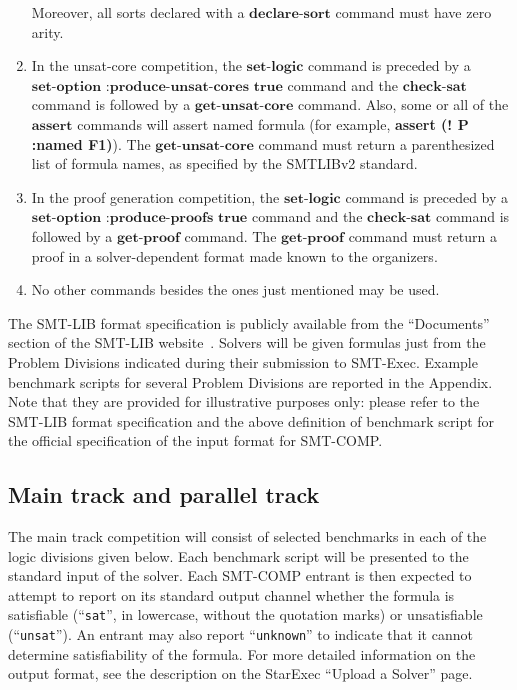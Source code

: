 \documentclass[12pt]{article}
\newcommand{\akey}[1]{\textbf{#1}}
\begin{document}
\begin{enumerate}
  Moreover, all sorts declared with a $\akey{declare-sort}$ command must have zero arity.
\item In the unsat-core competition, the $\akey{set-logic}$ command is preceded by a \\
$\akey{set-option :produce-unsat-cores true}$ command and the 
$\akey{check-sat}$ command is followed by a $\akey{get-unsat-core}$ command.
Also, some or all of the $\akey{assert}$ commands will assert named formula
(for example, \akey{assert (! P :named F1)}). The $\akey{get-unsat-core}$
command must return a parenthesized list of formula names, as specified by the 
SMTLIBv2 standard.
\item In the proof generation competition, the $\akey{set-logic}$ command is preceded by a \\
$\akey{set-option :produce-proofs true}$ command and the 
$\akey{check-sat}$ command is followed by a $\akey{get-proof}$ command.
The $\akey{get-proof}$ command must return a proof in a solver-dependent format made known to the organizers.
\item No other commands besides the ones just mentioned may be used.

\end{enumerate}

  
\noindent The SMT-LIB format specification is publicly
available from the ``Documents'' section of the SMT-LIB
website~\cite{SMT-LIB}.  Solvers will be given formulas just from the
Problem Divisions indicated during their submission to SMT-Exec.
Example benchmark scripts for several Problem Divisions are reported in the Appendix.
Note that they are provided for illustrative purposes only: 
please refer to the SMT-LIB format specification 
and the above definition of benchmark script for the official specification 
of the input format for SMT-COMP.

\subsection{Main track and parallel track}
\label{sec:exec:main}

The main track competition will consist of selected benchmarks in each of the
logic divisions given below.
Each benchmark script will be presented to the standard input of the solver.
Each SMT-COMP entrant is then expected to attempt to report on its
standard output channel whether the formula is satisfiable
(``\texttt{sat}'', in lowercase, without the quotation marks) or unsatisfiable
(``\texttt{unsat}'').  An entrant may also report ``\texttt{unknown}''
to indicate that it cannot determine satisfiability of the formula.
For more detailed information on the output format, see the
description on the StarExec ``Upload a Solver'' page.  %
\end{document}
